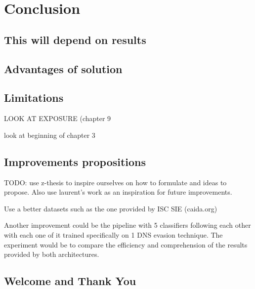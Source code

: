 
\chapter{Conclusion} %

\label{Conclusion} %

\section{This will depend on results}
\section{Advantages of solution}
\section{Limitations}
LOOK AT EXPOSURE (chapter 9

look at beginning of chapter 3
\section{Improvements propositions}
TODO: use z-thesis to inspire ourselves on how to formulate and ideas to propose.
Also use laurent's work as an inspiration for future improvements.

Use a better datasets such as the one provided by ISC SIE (caida.org)

Another improvement could be the pipeline with 5 classifiers following each other with each one of it trained specifically on 1 DNS evasion technique. The experiment would be to compare the efficiency and comprehension of the results provided by both architectures.
\section{Welcome and Thank You}

